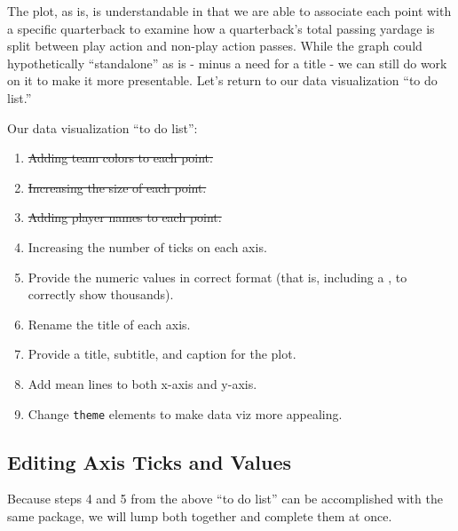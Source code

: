 \documentclass[
  letterpaper,
]{krantz}
\begin{document}
The plot, as is, is understandable in that we are able to associate each
point with a specific quarterback to examine how a quarterback's total
passing yardage is split between play action and non-play action passes.
While the graph could hypothetically ``standalone'' as is - minus a need
for a title - we can still do work on it to make it more presentable.
Let's return to our data visualization ``to do list.''

\begin{tcolorbox}[enhanced jigsaw, left=2mm, toprule=.15mm, opacitybacktitle=0.6, leftrule=.75mm, bottomrule=.15mm, colbacktitle=quarto-callout-note-color!10!white, breakable, colback=white, bottomtitle=1mm, toptitle=1mm, title=\textcolor{quarto-callout-note-color}{\faInfo}\hspace{0.5em}{Note}, coltitle=black, titlerule=0mm, arc=.35mm, opacityback=0, colframe=quarto-callout-note-color-frame, rightrule=.15mm]

Our data visualization ``to do list'':

\begin{enumerate}
\def\labelenumi{\arabic{enumi}.}
\item
  \st{Adding team colors to each point.}
\item
  \st{Increasing the size of each point.}
\item
  \st{Adding player names to each point.}
\item
  Increasing the number of ticks on each axis.
\item
  Provide the numeric values in correct format (that is, including a ,
  to correctly show thousands).
\item
  Rename the title of each axis.
\item
  Provide a title, subtitle, and caption for the plot.
\item
  Add mean lines to both x-axis and y-axis.
\item
  Change \texttt{theme} elements to make data viz more appealing.
\end{enumerate}

\end{tcolorbox}

\hypertarget{editing-axis-ticks-and-values}{%
\subsection{Editing Axis Ticks and
Values}\label{editing-axis-ticks-and-values}}

Because steps 4 and 5 from the above ``to do list'' can be accomplished
with the same package, we will lump both together and complete them at
once.
\end{document}
